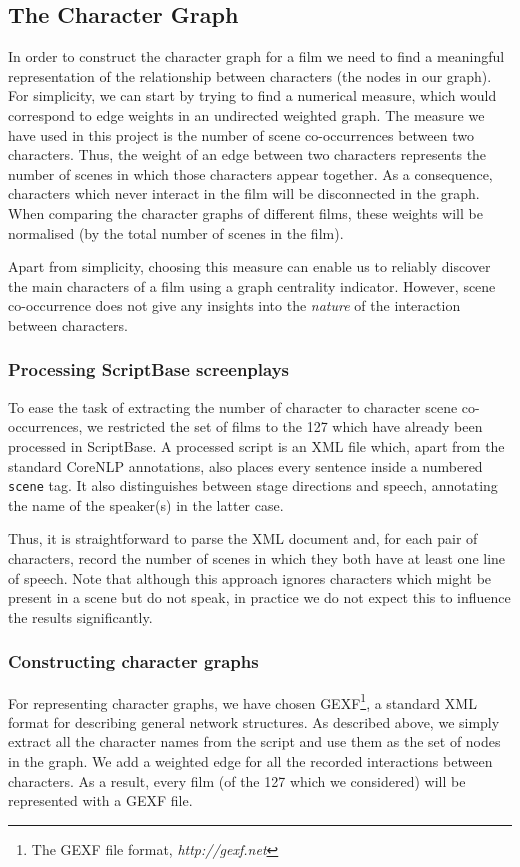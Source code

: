 \documentclass[bsc,frontabs,singlespacing,parskip]{infthesis} %
\begin{document}
\subsection{The Character Graph}
In order to construct the character graph for a film we need to find a meaningful representation of the relationship between characters (the nodes in our graph). For simplicity, we can start by trying to find a numerical measure, which would correspond to edge weights in an undirected weighted graph. The measure we have used in this project is the number of scene co-occurrences between two characters. Thus, the weight of an edge between two characters represents the number of scenes in which those characters appear together. As a consequence, characters which never interact in the film will be disconnected in the graph. When comparing the character graphs of different films, these weights will be normalised (by the total number of scenes in the film).

Apart from simplicity, choosing this measure can enable us to reliably discover the main characters of a film using a graph centrality indicator. However, scene co-occurrence does not give any insights into the \textit{nature} of the interaction between characters.

\subsubsection{Processing ScriptBase screenplays}
To ease the task of extracting the number of character to character scene co-occurrences, we restricted the set of films to the 127 which have already been processed in ScriptBase. A processed script is an XML file which, apart from the standard CoreNLP annotations, also places every sentence inside a numbered \texttt{scene} tag. It also distinguishes between stage directions and speech, annotating the name of the speaker(s) in the latter case.

Thus, it is straightforward to parse the XML document and, for each pair of characters, record the number of scenes in which they both have at least one line of speech. Note that although this approach ignores characters which might be present in a scene but do not speak, in practice we do not expect this to influence the results significantly.

\subsubsection{Constructing character graphs}
For representing character graphs, we have chosen GEXF\footnote{The GEXF file format, \textit{http://gexf.net}}, a standard XML format for describing general network structures. As described above, we simply extract all the character names from the script and use them as the set of nodes in the graph. We add a weighted edge for all the recorded interactions between characters. As a result, every film (of the 127 which we considered) will be represented with a GEXF file.
\end{document}
